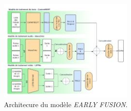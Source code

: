 \begin{figure}[H]
    \centering
    \includegraphics[width=0.6\textwidth]{image_model/early_fusion.png}
    \caption{Architecure du modèle \textit{EARLY FUSION}.}
    \label{fig: EARLY FUSION}
\end{figure}